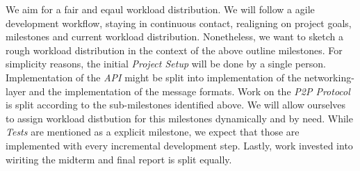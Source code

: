 \documentclass[a4paper, 11pt]{article}
\begin{document}
    We aim for a fair and eqaul workload distribution.
    We will follow a agile development workflow, staying in continuous contact, realigning on project goals, milestones and
    current workload distribution.
    Nonetheless, we want to sketch a rough workload distribution in the context of the above outline milestones.
    For simplicity reasons, the initial \textit{Project Setup} will be done by a single person.
    Implementation of the \textit{API} might be split into implementation of the networking-layer and the implementation of the message formats.
    Work on the \textit{P2P Protocol} is split according to the sub-milestones identified above.
    We will allow ourselves to assign workload distbution for this milestones dynamically and by need.
    While \textit{Tests} are mentioned as a explicit milestone, we expect that those are implemented with every incremental development step.
    Lastly, work invested into wiriting the midterm and final report is split equally.
\end{document}
